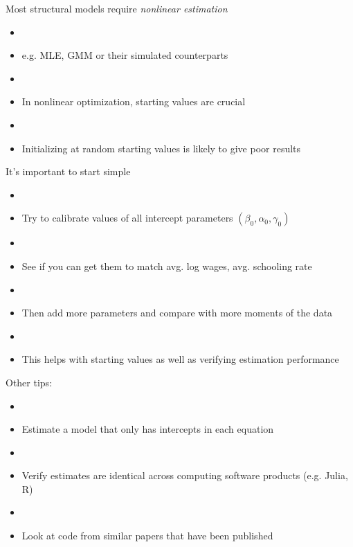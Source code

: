 \documentclass[aspectratio=169]{beamer}
\begin{document}
\begin{frame}

Most structural models require \textit{nonlinear estimation}

\begin{itemize}
\item[]
\item e.g. MLE, GMM or their simulated counterparts
\item[]
\item In nonlinear optimization, starting values are crucial
\item[]
\item Initializing at random starting values is likely to give poor results
\end{itemize}

    
\end{frame}




\begin{frame}
It's important to start simple

\begin{itemize}
\item[]
\item Try to calibrate values of all intercept parameters $(\beta_0,\alpha_0,\gamma_0)$
\item[]
\item See if you can get them to match avg. log wages, avg. schooling rate
\item[]
\item Then add more parameters and compare with more moments of the data
\item[]
\item This helps with starting values as well as verifying estimation performance
\end{itemize}


\end{frame}

\begin{frame}
Other tips:

\begin{itemize}
\item[]
\item Estimate a model that only has intercepts in each equation
\item[]
\item Verify estimates are identical across computing software products (e.g. Julia, R)
\item[]
\item Look at code from similar papers that have been published
\end{itemize}


\end{frame}
\end{document}
